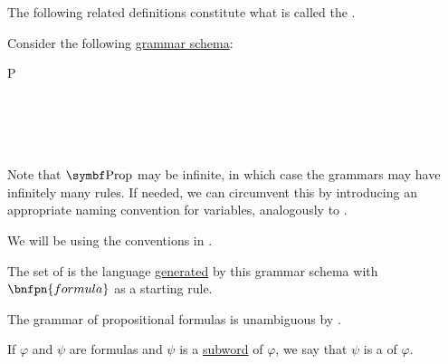 \begin{definition}\label{def:propositional_syntax}
  The following related definitions constitute what is called the .

  \begin{defenum}
     Consider the following \hyperref[def:backus_naur_form]{grammar schema}:
    \begin{bnf*}
         {P \in {}} \\
       {\circ \in \Sigma} \\
          { \bnfor} \\
      \bnfmore             {\bnfts{\( \top \)} \bnfor \bnfts{\( \bot \)} \bnfor} \\
       \\
    \end{bnf*}

    Note that \( \bfop{Prop} \) may be infinite, in which case the grammars may have infinitely many rules. If needed, we can circumvent this by introducing an appropriate naming convention for variables, analogously to .

    We will be using the conventions in .

     The set of  is the language \hyperref[def:grammar_derivation/grammar_language]{generated} by this grammar schema with \( \bnfpn{formula} \) as a starting rule.

    The grammar of propositional formulas is unambiguous by .

     If \( \varphi \) and \( \psi \) are formulas and \( \psi \) is a \hyperref[def:language/subword]{subword} of \( \varphi \), we say that \( \psi \) is a  of \( \varphi \).


\end{defenum}
\end{definition}
